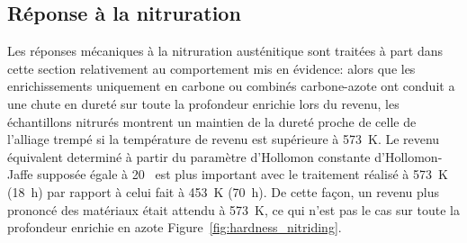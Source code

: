 \subsection{Réponse à la nitruration}

Les réponses mécaniques à la nitruration austénitique sont traitées à part dans cette section relativement au comportement mis en évidence: alors que les enrichissements uniquement en carbone ou combinés carbone-azote ont conduit a une chute en dureté sur toute la profondeur enrichie lors du revenu, les échantillons nitrurés montrent un maintien de la dureté proche de celle de l'alliage trempé si la température de revenu est supérieure à \SI{573}{\kelvin}. Le revenu équivalent determiné à partir du paramètre d'Hollomon \textendash{} constante d'Hollomon-Jaffe supposée égale à 20~\cite{Wan2005,Steel2006} \textendash{} est plus important avec le traitement réalisé à \SI{573}{\kelvin} (\SI{18}{\hour}) par rapport à celui fait à \SI{453}{\kelvin} (\SI{70}{\hour}). De cette façon, un revenu plus prononcé des matériaux était attendu à \SI{573}{\kelvin}, ce qui n'est pas le cas sur toute la profondeur enrichie en azote \textemdash{} Figure~\ref{fig:hardness_nitriding}. 

